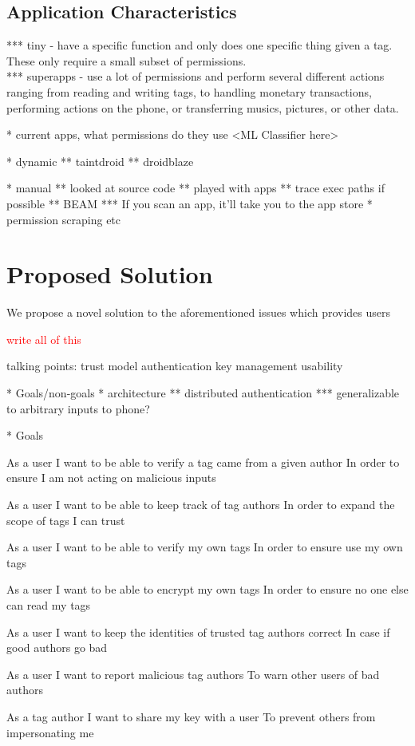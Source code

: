 \documentclass[12pt]{article}
\newcommand\TODO[1]{\textcolor{red}{#1}}
\begin{document}
\subsection{Application Characteristics}
*** tiny - have a specific function and only does one specific thing given a tag. These only require a small subset of permissions. 
\\
*** superapps - use a lot of permissions and perform several different actions ranging from reading and writing tags, to handling monetary transactions, performing actions on the phone, or transferring musics, pictures, or other data.

* current apps, what permissions do they use
<ML Classifier here>

* dynamic
** taintdroid
** droidblaze

* manual
** looked at source code
** played with apps
** trace exec paths if possible
** BEAM
*** If you scan an app, it'll take you to the app store
* permission scraping etc

\section{Proposed Solution}
We propose a novel solution to the aforementioned issues which provides users 

\TODO{write all of this}

talking points:
trust model
authentication
key management
usability

* Goals/non-goals
* architecture
** distributed authentication
*** generalizable to arbitrary inputs to phone?

* Goals

As a user
I want to be able to verify a tag came from a given author
In order to ensure I am not acting on malicious inputs

As a user
I want to be able to keep track of tag authors
In order to expand the scope of tags I can trust

As a user
I want to be able to verify my own tags
In order to ensure use my own tags

As a user
I want to be able to encrypt my own tags
In order to ensure no one else can read my tags

As a user
I want to keep the identities of trusted tag authors correct
In case if good authors go bad

As a user
I want to report malicious tag authors
To warn other users of bad authors

As a tag author
I want to share my key with a user
To prevent others from impersonating me
\end{document}
